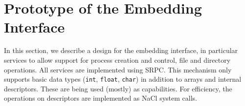 \section{Prototype of the Embedding Interface}
\label{sec:prototype}





In this section, we describe a design for the embedding interface, in
particular services to allow support for process creation and control,
file and directory operations.  All services are implemented using SRPC.
This mechanism only supports basic data types (\ie \lstinline`int`,
\lstinline`float`, \lstinline`char`) in addition to arrays and internal
descriptors. These are being used (mostly) as capabilities. For
efficiency, the operations on descriptors are implemented as NaCl system
calls.

